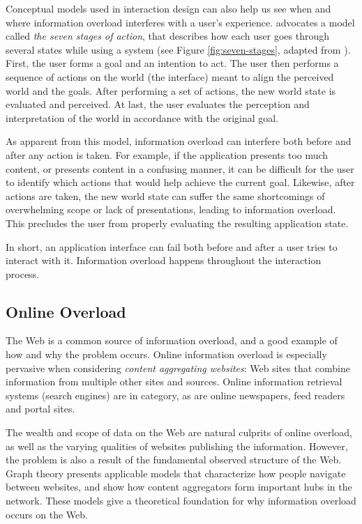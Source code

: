 Conceptual models used in interaction design can also help us see when and where information overload interferes with a user's experience. 
\cite{Norman1988} advocates a model called \emph{the seven stages of action}, 
that describes how each user goes through several states while using a system
(see Figure \ref{fig:seven-stages}, adapted from \citeauthor{Norman1988}). 
First, the user forms a goal and an intention to act. The user then performs a sequence of actions on the world (the interface)
 meant to align the perceived world and the goals. After performing a set of actions, the new world state is evaluated and perceived. 
At last, the user evaluates the perception and interpretation of the world in accordance with the original goal.

As apparent from this model, information overload can interfere both before and after any action is taken. 
For example, if the application presents too much content, or presents content in a confusing manner, 
it can be difficult for the user to identify which actions that would help achieve the current goal. 
Likewise, after actions are taken, the new world state can suffer the same shortcomings of overwhelming scope or lack of presentations, 
leading to information overload. 
This precludes the user from properly evaluating the resulting application state. 

In short, an application interface can fail both before and after a user tries to interact with it.
Information overload happens throughout the interaction process.


\subsection{Online Overload}

The Web is a common source of information overload, 
and a good example of how and why the problem occurs.
Online information overload is especially pervasive when considering \emph{content aggregating websites}:
Web sites that combine information from multiple other sites and sources. 
Online information retrieval systems (search engines) are in category, as are
online newspapers, feed readers and portal sites.

The wealth and scope of data on the Web are natural culprits of online overload, 
as well as the varying qualities of websites publishing the information. 
However, the problem is also a result of the fundamental observed structure of the Web.
Graph theory presents applicable models that characterize how people navigate between websites, 
and show how content aggregators form important hubs in the network. 
These models give a theoretical foundation for why information overload occurs on the Web.


